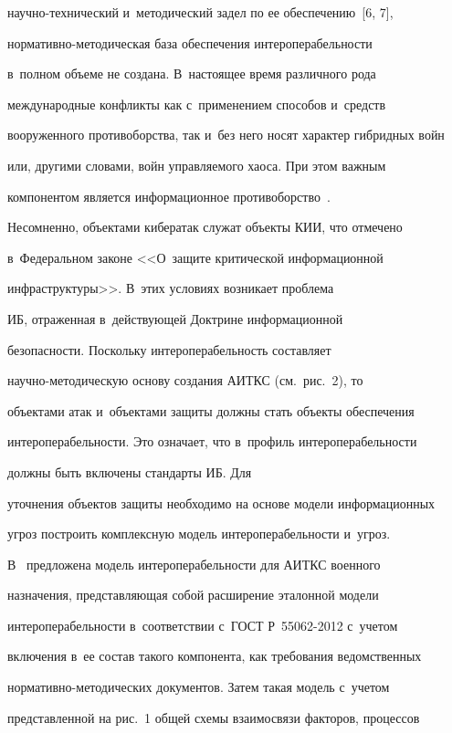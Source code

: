 на\-уч\-но-тех\-ни\-че\-ский и~методический задел по ее обеспечению~[6, 7],  

нор\-ма\-тив\-но-ме\-то\-ди\-че\-ская база обеспечения интероперабельности 

в~полном объеме не создана. В~настоящее время различного рода 

международные конфликты как с~применением способов и~средств 

вооруженного противоборства, так и~без него носят характер гибридных войн 

или, другими словами, войн управляемого хаоса. При этом важным 

компонентом является информационное противоборство~\cite{6-ba}. 

Несомненно, объектами кибератак служат объекты КИИ, что отмечено 

в~Федеральном законе <<О~защите критической информационной 

инфраструктуры>>. В~этих условиях возникает проблема 

ИБ, отраженная в~действующей Доктрине информационной 

безопасности. Поскольку интероперабельность составляет  

на\-уч\-но-ме\-то\-ди\-че\-скую основу создания АИТКС (см.\ рис.~2), то 

объектами атак и~объектами защиты должны стать объекты обеспечения 

интероперабельности. Это означает, что в~профиль интероперабельности 

должны быть включены стандарты ИБ. Для 

уточнения объектов защиты необходимо на основе модели информационных 

угроз построить комплексную модель интероперабельности и~угроз.

  

  В~\cite{6-ba} предложена модель интероперабельности для АИТКС военного 

назначения, представляющая собой расширение эталонной модели 

интероперабельности в~соответствии с~ГОСТ Р~55062-2012 с~учетом 

включения в~ее состав такого компонента, как требования ведомственных  

нор\-ма\-тив\-но-ме\-то\-ди\-че\-ских документов. Затем такая модель с~учетом 

представленной на рис.~1 общей схемы взаимосвязи факторов, процессов 

